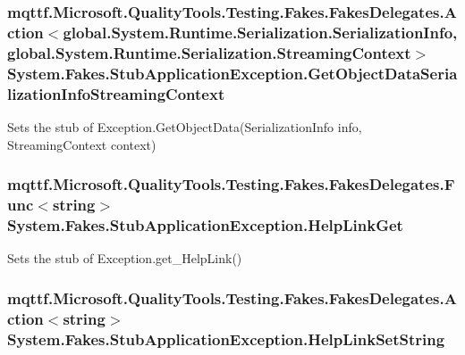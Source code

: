 \hypertarget{class_system_1_1_fakes_1_1_stub_application_exception_ae15253181536b60643081523c80f622b}{
\subsubsection[{Get\-Object\-Data\-Serialization\-Info\-Streaming\-Context}]{\setlength{\rightskip}{0pt plus 5cm}mqttf.\-Microsoft.\-Quality\-Tools.\-Testing.\-Fakes.\-Fakes\-Delegates.\-Action$<$global.\-System.\-Runtime.\-Serialization.\-Serialization\-Info, global.\-System.\-Runtime.\-Serialization.\-Streaming\-Context$>$ System.\-Fakes.\-Stub\-Application\-Exception.\-Get\-Object\-Data\-Serialization\-Info\-Streaming\-Context}}\label{class_system_1_1_fakes_1_1_stub_application_exception_ae15253181536b60643081523c80f622b}


Sets the stub of Exception.\-Get\-Object\-Data(\-Serialization\-Info info, Streaming\-Context context)

\hypertarget{class_system_1_1_fakes_1_1_stub_application_exception_af127d3806deb1c05e95028a5cd1829dd}{
\subsubsection[{Help\-Link\-Get}]{\setlength{\rightskip}{0pt plus 5cm}mqttf.\-Microsoft.\-Quality\-Tools.\-Testing.\-Fakes.\-Fakes\-Delegates.\-Func$<$string$>$ System.\-Fakes.\-Stub\-Application\-Exception.\-Help\-Link\-Get}}\label{class_system_1_1_fakes_1_1_stub_application_exception_af127d3806deb1c05e95028a5cd1829dd}


Sets the stub of Exception.\-get\-\_\-\-Help\-Link()

\hypertarget{class_system_1_1_fakes_1_1_stub_application_exception_ac9bd6bfb2c80c437c5825825cbbb4d69}{
\subsubsection[{Help\-Link\-Set\-String}]{\setlength{\rightskip}{0pt plus 5cm}mqttf.\-Microsoft.\-Quality\-Tools.\-Testing.\-Fakes.\-Fakes\-Delegates.\-Action$<$string$>$ System.\-Fakes.\-Stub\-Application\-Exception.\-Help\-Link\-Set\-String}}\label{class_system_1_1_fakes_1_1_stub_application_exception_ac9bd6bfb2c80c437c5825825cbbb4d69}


